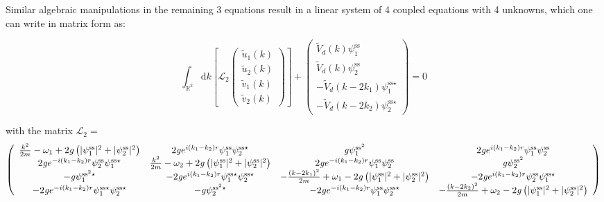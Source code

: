 \documentclass[12pt]{article}
\begin{document}
Similar algebraic manipulations in the remaining 3 equations result in a linear system of 4 coupled equations with 4 unknowns, which one can write in matrix form as:

\begin{equation}
\int_{\mathbb{R}^{2}}\mathrm{d}k\left[\mathcal{L}_2
\left(\begin{array}{c}
\tilde{u}_{1}(k)\\
\tilde{u}_{2}(k)\\
\tilde{v}_{1}(k)\\
\tilde{v}_{2}(k)
\end{array}\right)
\right]+
\left(\begin{array}{c}
\tilde{V}_d(k)\psi_{1}^{\text{ss}}\\
\tilde{V}_d(k)\psi_{2}^{\text{ss}}\\
-\tilde{V}_d(k-2k_1)\psi_{1}^{\text{ss}\star}\\
-\tilde{V}_d(k-2k_2)\psi_{2}^{\text{ss}\star}
\end{array}\right)
=0
\end{equation}

with the matrix $\mathcal{L}_2=$
\small
\begin{equation}
\left(\begin{array}{cccc}
\frac{k^{2}}{2m}-\text{\ensuremath{\omega_{1}}}+2\mathit{g}\left(|\psi_{1}^{\text{ss}}|^{2}+|\psi_{2}^{\text{ss}}|^{2}\right) & 2\mathit{g}e^{i(k_{1}-k_{2})r}\psi_{1}^{\text{ss}}\psi_{2}^{\text{ss}\star} & \mathit{g}\psi_{1}^{\text{ss}^{2}} & 2\mathit{g}e^{i(k_{1}-k_{2})r}\psi_{1}^{\text{ss}}\psi_{2}^{\text{ss}}\\
2\mathit{g}e^{-i(k_{1}-k_{2})r}\psi_{2}^{\text{ss}}\psi_{1}^{\text{ss}\star} & \frac{k^{2}}{2m}-\text{\ensuremath{\omega_{2}}}+2\mathit{g}\left(|\psi_{1}^{\text{ss}}|^{2}+|\psi_{2}^{\text{ss}}|^{2}\right) & 2\mathit{g}e^{-i(k_{1}-k_{2})r}\psi_{1}^{\text{ss}}\psi_{2}^{\text{ss}} & \mathit{g}\psi_{2}^{\text{ss}^{2}}\\
-\mathit{g}\psi_{1}^{\text{ss}^{2}\star} & -2\mathit{g}e^{i(k_{1}-k_{2})r}\psi_{1}^{\text{ss}\star}\psi_{2}^{\text{ss}\star} & -\frac{(k-2k_{1})^{2}}{2m}+\text{\ensuremath{\omega_{1}}}-2\mathit{g}\left(|\psi_{1}^{\text{ss}}|^{2}+|\psi_{2}^{\text{ss}}|^{2}\right) & -2\mathit{g}e^{i(k_{1}-k_{2})r}\psi_{2}^{\text{ss}}\psi_{1}^{\text{ss}\star}\\
-2\mathit{g}e^{-i(k_{1}-k_{2})r}\psi_{1}^{\text{ss}\star}\psi_{2}^{\text{ss}\star} & -\mathit{g}\psi_{2}^{\text{ss}^{2}\star} & -2\mathit{g}e^{-i(k_{1}-k_{2})r}\psi_{1}^{\text{ss}}\psi_{2}^{\text{ss}\star} & -\frac{(k-2k_{2})^{2}}{2m}+\text{\ensuremath{\omega_{2}}}-2\mathit{g}\left(|\psi_{1}^{\text{ss}}|^{2}+|\psi_{2}^{\text{ss}}|^{2}\right)
\end{array}\right)
\end{equation}
\normalsize
\end{document}
